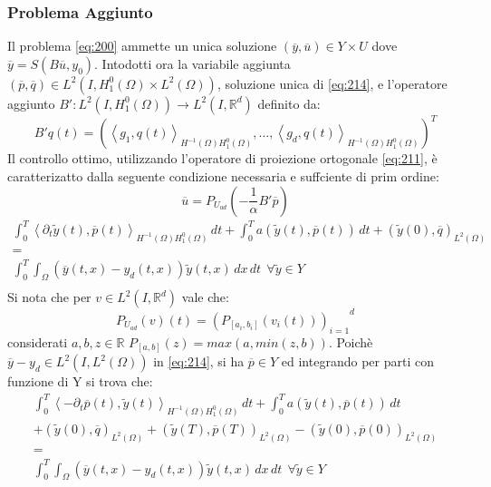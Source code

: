 \subsubsection{Problema Aggiunto}
Il problema \ref{eq:200} ammette un unica soluzione $(\overline{y},\overline{u}){\in}Y{\times}U$ dove $\overline{y}=S(B\overline{u},y_0)$.
Intodotti ora la variabile aggiunta $(\overline{p},\overline{q}) \in L^2(I,{H^{0}_{1}(\Omega)}{\times}{L^{2}(\Omega)})$, soluzione unica di \ref{eq:214}, e l'operatore aggiunto $B':L^2(I,{H^{0}_{1}(\Omega)}){\rightarrow}L^2(I,\mathbb{R}^d)$ definito da:
\begin{equation}
B'q(t) = ( \left \langle g_1,q(t) \right \rangle_{{H^{-1}(\Omega)}{H^{0}_{1}(\Omega)}}, . . . ,\left \langle g_d,q(t) \right \rangle_{{H^{-1}(\Omega)}{H^{0}_{1}(\Omega)}})^T
\label{eq:212}
\end{equation}
Il controllo ottimo, utilizzando l'operatore di proiezione ortogonale \ref{eq:211}, è caratterizatto dalla seguente condizione necessaria e suffciente di prim ordine:
\begin{equation}
\overline{u}=P_{U_{ad}}\left( -\frac{1}{\alpha}B'\overline{p} \right)
\label{eq:213}
\end{equation}
\begin{equation}
\begin{array}{c}
	\int_{0}^{T} \left \langle {\partial_{t}}\tilde{y}(t),\overline{p}(t) \right \rangle_{{H^{-1}(\Omega)}{H^{0}_{1}(\Omega)}} \, dt +  	\int_{0}^{T} a(\tilde{y}(t),\overline{p}(t)) \, dt + (\tilde{y}(0),\overline{q})_{L^{2}(\Omega)}  \\
	 = \\
	\int_{0}^{T} \int_{\Omega} (\overline{y}(t,x)-y_d(t,x))\tilde{y}(t,x) \,dx \, dt  \ \ \forall \tilde{y} \in Y \\
\end{array}
\label{eq:214}
\end{equation}
Si nota che per $v \in L^2(I,\mathbb{R}^d)$ vale che:
\begin{equation}
P_{U_{ad}}(v)(t) = {(P_{[a_i,b_i]}(v_i(t)))_{i=1}}^d
\label{eq:215}
\end{equation}
considerati $a,b,z \in \mathbb{R}$ $P_{[a,b]}(z) = max(a,min(z,b))$.
Poichè $\overline{y} - y_d \in L^2(I,{L^{2}(\Omega)})$ in \ref{eq:214}, si ha $\overline{p} \in Y$ ed integrando per parti con funzione di Y si trova che:
{\renewcommand\arraystretch{2}
\begin{equation}
\begin{array}{c}
	\int_{0}^{T} \left \langle -{\partial_{t}}\overline{p}(t),\tilde{y}(t) \right \rangle_{{H^{-1}(\Omega)}{H^{0}_{1}(\Omega)}} \, dt +  	\int_{0}^{T} a(\tilde{y}(t),\overline{p}(t)) \, dt \\
	+ (\tilde{y}(0),\overline{q})_{L^{2}(\Omega)} + (\tilde{y}(T),\overline{p}(T))_{L^{2}(\Omega)} - (\tilde{y}(0),\overline{p}(0))_{L^{2}(\Omega)} \\
	 = \\
	\int_{0}^{T} \int_{\Omega} (\overline{y}(t,x)-y_d(t,x))\tilde{y}(t,x) \,dx \, dt  \ \ \forall \tilde{y} \in Y \\
\end{array}
\label{eq:216}
\end{equation}
} %
